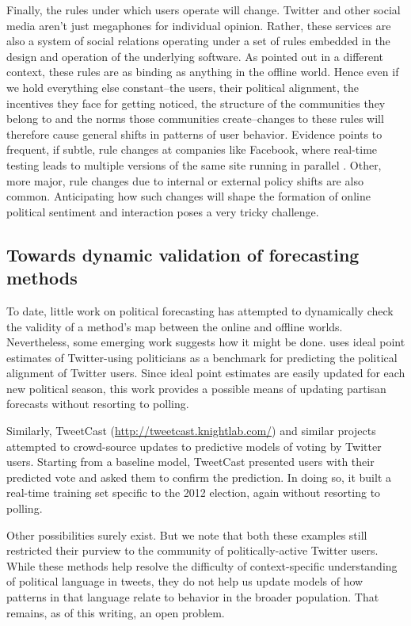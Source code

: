 \documentclass{article}
\begin{document}
Finally, the rules under which users operate will change. Twitter and
other social media aren't just megaphones for individual
opinion. Rather, these services are also a system of social relations
operating under a set of rules embedded in the design and operation of
the underlying software. As \cite{lessig1999code} pointed out in a
different context, these rules are as binding as anything in the
offline world. Hence even if we hold everything else constant--the
users, their political alignment, the incentives they face for getting
noticed, the structure of the communities they belong to and the norms
those communities create--changes to these rules will therefore cause
general shifts in patterns of user behavior. Evidence points to
frequent, if subtle, rule changes at companies like Facebook, where
real-time testing leads to multiple versions of the same site running
in parallel \citep{vance2012facebook}. Other, more major, rule changes
due to internal or external policy shifts are also
common. Anticipating how such changes will shape the formation of
online political sentiment and interaction poses a very tricky
challenge. 

\subsection{Towards dynamic validation of forecasting methods}
\label{sec:towards-dynam-valid}

To date, little work on political forecasting has attempted to
dynamically check the validity of a method's map between the online
and offline worlds. Nevertheless, some emerging work suggests how it
might be done. \cite{barbera2012birds} uses ideal point estimates
\citep{poole1985spatial} of Twitter-using politicians as a benchmark
for predicting the political alignment of Twitter users. Since ideal
point estimates are easily updated for each new political season, this
work provides a possible means of updating partisan forecasts without
resorting to polling.

Similarly, TweetCast (\url{http://tweetcast.knightlab.com/}) and
similar projects attempted to crowd-source updates to predictive
models of voting by Twitter users. Starting from a baseline model,
TweetCast presented users with their predicted vote and asked them to
confirm the prediction. In doing so, it built a real-time training set
specific to the 2012 election, again without resorting to polling. 

Other possibilities surely exist. But we note that both these examples
still restricted their purview to the community of politically-active
Twitter users. While these methods help resolve the difficulty of
context-specific understanding of political language in tweets, they
do not help us update models of how patterns in that language relate
to behavior in the broader population. That remains, as of
this writing, an open problem.
\end{document}
